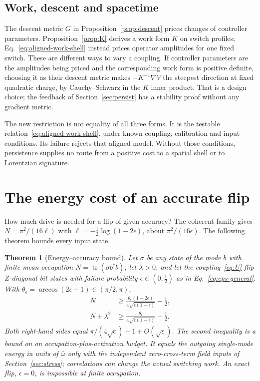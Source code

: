 \documentclass[aps,pre,onecolumn,superscriptaddress,floatfix,longbibliography]{revtex4-2}
\newtheorem{theorem}{Theorem}
\begin{document}
\subsection{Work, descent and spacetime}

The descent metric $G$ in Proposition~\ref{prop:descent} prices
changes of controller parameters. Proposition~\ref{prop:K} derives a
work form $K$ on switch profiles; Eq.~\eqref{eq:aligned-work-shell}
instead prices operator amplitudes for one fixed switch. These are
different ways to vary a coupling. If controller parameters are the
amplitudes being priced and the corresponding work form is positive
definite, choosing it as their descent metric makes $-K^{-1}\nabla V$ the steepest direction
at fixed quadratic charge, by Cauchy--Schwarz in the $K$ inner product.
That is a design choice; the feedback of Section~\ref{sec:persist}
has a stability proof without any gradient metric.

The new restriction is not equality of all three forms. It is the
testable relation~\eqref{eq:aligned-work-shell}, under known coupling,
calibration and input conditions. Its failure rejects that aligned
model. Without those conditions, persistence supplies no route from
a positive cost to a spatial shell or to Lorentzian signature.

\section{The energy cost of an accurate flip}
\label{sec:energy}

How much drive is needed for a flip of given accuracy? The coherent family gives $N=\pi^2/(16\ell)$ with $\ell=-\tfrac12\log(1-2\epsilon)$, about $\pi^2/(16\epsilon)$. The following theorem bounds every input state.

\begin{theorem}[Energy--accuracy bound]
\label{thm:energy}
Let $\sigma$ be any state of the mode $b$ with finite mean occupation $N=\operatorname{tr}(\sigma b^\dagger b)$, let $\lambda>0$, and let the coupling~\eqref{eq:U} flip $Z$-diagonal bit states with failure probability $\epsilon\in(0,\tfrac12)$ as in Eq.~\eqref{eq:eps-general}. With $\theta_\epsilon=\arccos(2\epsilon-1)\in(\pi/2,\pi)$,
\begin{align}
N&\ge\frac{\theta_\epsilon(1-2\epsilon)}{4\sqrt{\epsilon(1-\epsilon)}}-\frac12,\label{eq:boundN}\\
N+\lambda^2&\ge\frac{\theta_\epsilon}{4\sqrt{\epsilon(1-\epsilon)}}-\frac12.\label{eq:boundNW}
\end{align}
Both right-hand sides equal $\pi/(4\sqrt\epsilon)-1+O(\sqrt\epsilon)$. The second inequality is a bound on an occupation-plus-activation budget. It equals the outgoing single-mode energy in units of $\bar\omega$ only with the independent zero-cross-term field inputs of Section~\ref{sec:stress}; correlations can change the actual switching work. An exact flip, $\epsilon=0$, is impossible at finite occupation.
\end{theorem}
\end{document}

